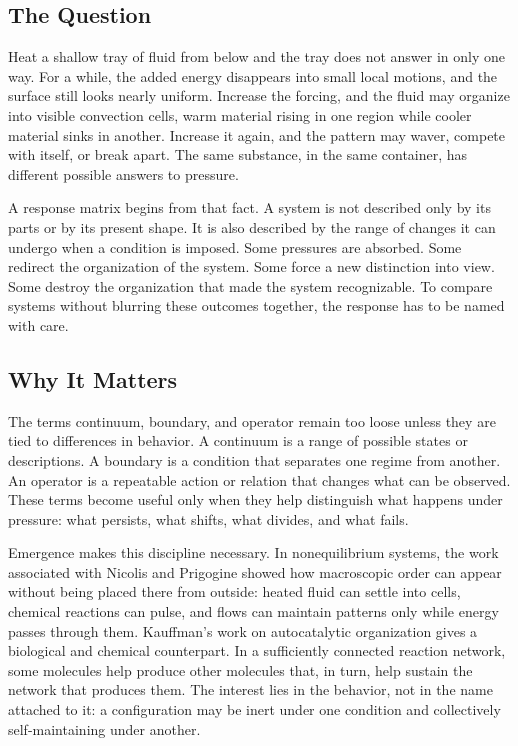 \documentclass[11pt,a4paper,openany]{book}
\begin{document}
\subsection{The Question}
Heat a shallow tray of fluid from below and the tray does not answer in only one way. For a while, the added energy disappears into small local motions, and the surface still looks nearly uniform. Increase the forcing, and the fluid may organize into visible convection cells, warm material rising in one region while cooler material sinks in another. Increase it again, and the pattern may waver, compete with itself, or break apart. The same substance, in the same container, has different possible answers to pressure. \cite{nicolis_prigogine_selforg,kauffman_autocatalytic}\par
A response matrix begins from that fact. A system is not described only by its parts or by its present shape. It is also described by the range of changes it can undergo when a condition is imposed. Some pressures are absorbed. Some redirect the organization of the system. Some force a new distinction into view. Some destroy the organization that made the system recognizable. To compare systems without blurring these outcomes together, the response has to be named with care.\par
\subsection{Why It Matters}
The terms continuum, boundary, and operator remain too loose unless they are tied to differences in behavior. A continuum is a range of possible states or descriptions. A boundary is a condition that separates one regime from another. An operator is a repeatable action or relation that changes what can be observed. These terms become useful only when they help distinguish what happens under pressure: what persists, what shifts, what divides, and what fails. \cite{nicolis_prigogine_selforg,kauffman_autocatalytic}\par
Emergence makes this discipline necessary. In nonequilibrium systems, the work associated with Nicolis and Prigogine showed how macroscopic order can appear without being placed there from outside: heated fluid can settle into cells, chemical reactions can pulse, and flows can maintain patterns only while energy passes through them. Kauffman's work on autocatalytic organization gives a biological and chemical counterpart. In a sufficiently connected reaction network, some molecules help produce other molecules that, in turn, help sustain the network that produces them. The interest lies in the behavior, not in the name attached to it: a configuration may be inert under one condition and collectively self-maintaining under another.\par
\end{document}
